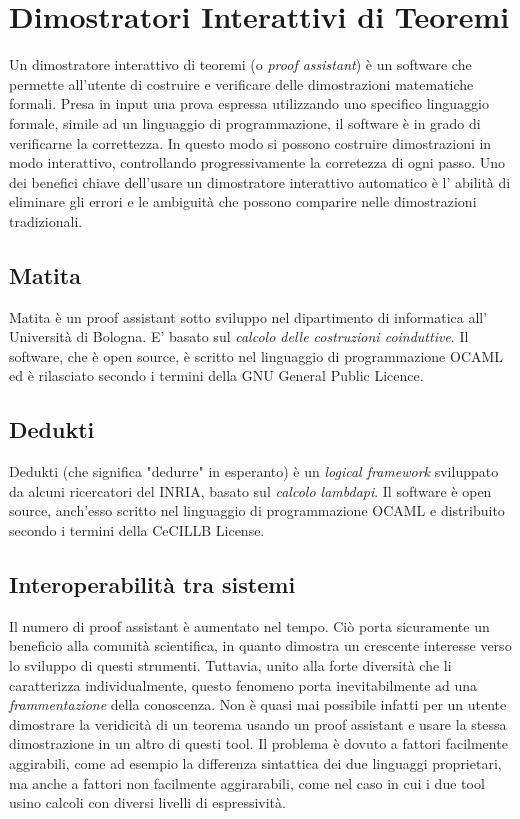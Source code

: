 \documentclass[12pt,a4paper]{report}
\begin{document}
\section{Dimostratori Interattivi di Teoremi}
Un dimostratore interattivo di teoremi (o \textit{proof assistant}) è un software 
che permette all'utente di costruire e verificare delle dimostrazioni matematiche
formali. Presa in input una prova espressa utilizzando uno specifico linguaggio 
formale, simile ad un linguaggio di programmazione, il software è in grado di
verificarne la correttezza. In questo modo si possono costruire dimostrazioni
in modo interattivo, controllando progressivamente la corretezza di ogni passo.
Uno dei benefici chiave dell'usare un dimostratore interattivo automatico è l'
abilità di eliminare gli errori e le ambiguità che possono comparire nelle 
dimostrazioni tradizionali.

\subsection{Matita}
Matita è un  proof assistant sotto sviluppo nel dipartimento di informatica all'
Università di Bologna. E' basato sul \textit{calcolo delle costruzioni coinduttive}.
Il software, che è open source, è scritto nel linguaggio di programmazione OCAML 
ed è rilasciato secondo i termini della GNU General Public Licence.

\subsection{Dedukti}
Dedukti (che significa "dedurre" in esperanto) è un \textit{logical framework}
sviluppato da alcuni ricercatori del INRIA, basato sul \textit{calcolo lambda\-pi}.
Il software è open source, anch'esso scritto nel linguaggio di programmazione OCAML
e distribuito secondo i termini della CeCILL\-B License.

\subsection{Interoperabilità tra sistemi}
Il numero di proof assistant è aumentato nel tempo. Ciò porta sicuramente un
beneficio alla comunità scientifica, in quanto dimostra un crescente interesse
verso lo sviluppo di questi strumenti. Tuttavia, unito alla forte diversità che
li caratterizza individualmente, questo fenomeno porta inevitabilmente
ad una \textit{frammentazione} della conoscenza. Non è quasi mai possibile infatti
per un utente dimostrare la veridicità di un teorema usando un proof assistant
e usare la stessa dimostrazione in un altro di questi tool. Il problema è dovuto
a fattori facilmente aggirabili, come ad esempio la differenza sintattica dei due
linguaggi proprietari, ma anche a fattori non facilmente aggirarabili, come nel
caso in cui i due tool usino calcoli con diversi livelli di espressività.
\end{document}
